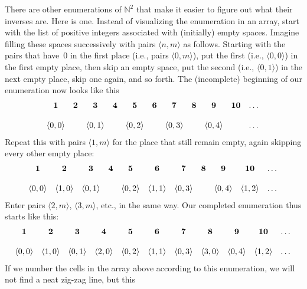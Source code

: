 \documentclass[10pt,a4paper]{article}
\theoremstyle{plain}
\theoremstyle{definition}
\theoremstyle{remark}
\newenvironment{explain}{}{}
\providecommand{\tuple}[1]{\langle #1 \rangle}
\providecommand{\Nat}{\ensuremath{\mathbb{N}}}
\begin{document}
\begin{explain}
There are other enumerations of $\Nat^2$ that make it easier to
figure out what their inverses are. Here is one. Instead of
visualizing the enumeration in an array, start with the list of
positive integers associated with (initially) empty spaces. Imagine
filling these spaces successively with pairs $\tuple{n,m}$ as follows.
Starting with the pairs that have~$0$ in  the first place (i.e., pairs
$\tuple{0,m}$), put the first (i.e., $\tuple{0,0}$) in the first empty
place, then skip an empty space, put the second (i.e., $\tuple{0,1}$)
in the next empty place, skip one again, and so forth. The
(incomplete) beginning of our enumeration now looks like this
\[\small
\begin{array}{@{}c c c c c c c c c c c@{}}
\mathbf 1 & \mathbf 2 & \mathbf 3 & \mathbf 4 & \mathbf 5 & \mathbf 6 & \mathbf 7 & \mathbf 8 & \mathbf 9 & \mathbf{10} & \dots \\ \\
\tuple{0,0} &  & \tuple{0,1} &  & \tuple{0,2} &  & \tuple{0,3} & & \tuple{0,4} &  & \dots \\
\end{array}
\]
Repeat this with pairs $\tuple{1,m}$ for the place that still remain
empty, again skipping every other empty place:
\[\small
\begin{array}{@{}c c c c c c c c c c c@{}}
\mathbf 1 & \mathbf 2 & \mathbf 3 & \mathbf 4 & \mathbf 5 & \mathbf 6 & \mathbf 7 & \mathbf 8 & \mathbf 9 & \mathbf{10} & \dots \\ \\
\tuple{0,0} & \tuple{1,0} & \tuple{0,1} &  & \tuple{0,2} & \tuple{1,1} & 
\tuple{0,3} & & \tuple{0,4} &  \tuple{1,2} & \dots \\
\end{array}
\]
Enter pairs $\tuple{2,m}$, $\tuple{3,m}$, etc., in the same way. Our
completed enumeration thus starts like this:
\[\small
\begin{array}{@{}cc c c c c c c c c c@{}}
\mathbf 1 & \mathbf 2 & \mathbf 3 & \mathbf 4 & \mathbf 5 & \mathbf 6 & \mathbf 7 & \mathbf 8 & \mathbf 9 & \mathbf{10} & \dots \\ \\
\tuple{0,0} & \tuple{1,0} & \tuple{0,1} & \tuple{2,0}  & \tuple{0,2} & 
\tuple{1,1} & \tuple{0,3} & \tuple{3,0}  & \tuple{0,4} &  \tuple{1,2} & \dots \\
\end{array}
\]
If we number the cells in the array above according to this
enumeration, we will not find a neat zig-zag line, but this

\end{explain}
\end{document}
